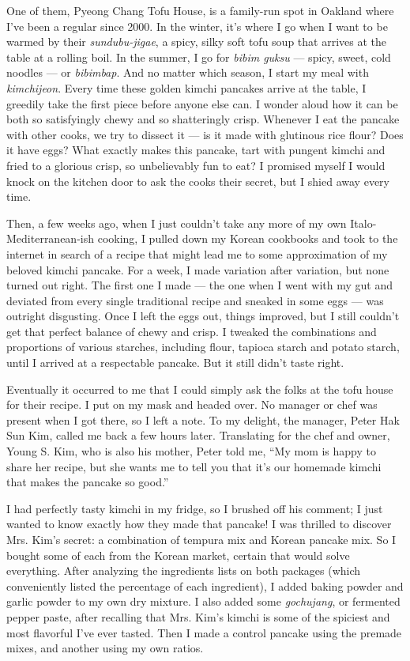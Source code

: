 One of them, Pyeong Chang Tofu House, is a family-run spot in Oakland
where I've been a regular since 2000. In the winter, it's where I go
when I want to be warmed by their \emph{sundubu-jigae}, a spicy, silky
soft tofu soup that arrives at the table at a rolling boil. In the
summer, I go for \emph{bibim guksu} --- spicy, sweet, cold noodles ---
or \emph{bibimbap}. And no matter which season, I start my meal with
\emph{kimchijeon}. Every time these golden kimchi pancakes arrive at the
table, I greedily take the first piece before anyone else can. I wonder
aloud how it can be both so satisfyingly chewy and so shatteringly
crisp. Whenever I eat the pancake with other cooks, we try to dissect it
--- is it made with glutinous rice flour? Does it have eggs? What
exactly makes this pancake, tart with pungent kimchi and fried to a
glorious crisp, so unbelievably fun to eat? I promised myself I would
knock on the kitchen door to ask the cooks their secret, but I shied
away every time.

Then, a few weeks ago, when I just couldn't take any more of my own
Italo-Mediterranean-ish cooking, I pulled down my Korean cookbooks and
took to the internet in search of a recipe that might lead me to some
approximation of my beloved kimchi pancake. For a week, I made variation
after variation, but none turned out right. The first one I made --- the
one when I went with my gut and deviated from every single traditional
recipe and sneaked in some eggs --- was outright disgusting. Once I left
the eggs out, things improved, but I still couldn't get that perfect
balance of chewy and crisp. I tweaked the combinations and proportions
of various starches, including flour, tapioca starch and potato starch,
until I arrived at a respectable pancake. But it still didn't taste
right.

Eventually it occurred to me that I could simply ask the folks at the
tofu house for their recipe. I put on my mask and headed over. No
manager or chef was present when I got there, so I left a note. To my
delight, the manager, Peter Hak Sun Kim, called me back a few hours
later. Translating for the chef and owner, Young S. Kim, who is also his
mother, Peter told me, ``My mom is happy to share her recipe, but she
wants me to tell you that it's our homemade kimchi that makes the
pancake so good.''

I had perfectly tasty kimchi in my fridge, so I brushed off his comment;
I just wanted to know exactly how they made that pancake! I was thrilled
to discover Mrs. Kim's secret: a combination of tempura mix and Korean
pancake mix. So I bought some of each from the Korean market, certain
that would solve everything. After analyzing the ingredients lists on
both packages (which conveniently listed the percentage of each
ingredient), I added baking powder and garlic powder to my own dry
mixture. I also added some \emph{gochujang}, or fermented pepper paste,
after recalling that Mrs. Kim's kimchi is some of the spiciest and most
flavorful I've ever tasted. Then I made a control pancake using the
premade mixes, and another using my own ratios.

